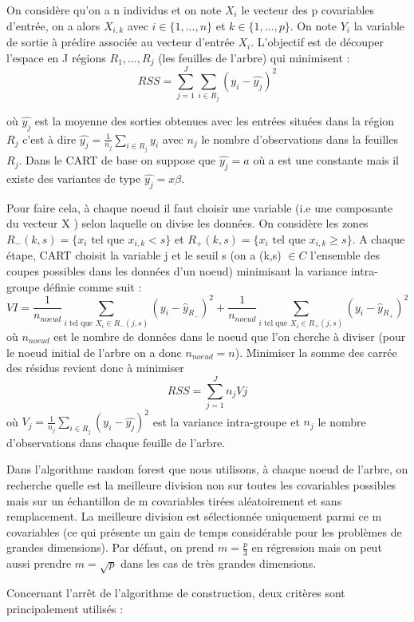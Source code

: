 \documentclass[
]{article}
\begin{document}
On considère qu'on a n individus et on note \(X_i\) le vecteur des p
covariables d'entrée, on a alors \(X_{i,k}\) avec \(i \in \{1,...,n\}\)
et \(k \in \{1,...,p\}\). On note \(Y_i\) la variable de sortie à
prédire associée au vecteur d'entrée \(X_i\). L'objectif est de découper
l'espace en J régions \(R_1,..., R_j\) (les feuilles de l'arbre) qui
minimisent :
\[RSS=\sum_{j=1}^{J}{\sum_{i\in R_j}{}}{(y_{i}-\hat{y_j})^2}\]

où \(\hat{y_j}\) est la moyenne des sorties obtenues avec les entrées
situées dans la région \(R_j\) c'est à dire
\(\hat{y_j}=\frac{1}{n_j}\sum_{i\in R_j}y_i\) avec \(n_j\) le nombre
d'observations dans la feuilles \(R_j\). Dans le CART de base on suppose
que \(\hat{y_j}=a\) où a est une constante mais il existe des variantes
de type \(\hat{y_j}=x \beta\).

Pour faire cela, à chaque noeud il faut choisir une variable (i.e une
composante du vecteur X ) selon laquelle on divise les données. On
considère les zones \(R_{-}(k,s)=\{x_i \text{ tel que }x_{i,k}<s\}\) et
\(R_{+}(k,s)=\{x_i\text{ tel que }x_{i,k}\geq s\}\). A chaque étape,
CART choisit la variable j et le seuil s (on a (k,s) \(\in C\)
l'ensemble des coupes possibles dans les données d'un noeud) minimisant
la variance intra-groupe définie comme suit :
\[VI=\frac{1}{n_{noeud}}\sum_{i \text{ tel que } X_i \in R_{-}(j,s)}(y_i-\hat{y}_{R_{-}})^2+\frac{1}{n_{noeud}}\sum_{i \text{ tel que } X_i\in R_{+}(j,s)}(y_i-\hat{y}_{R_{+}})^2\]
où \(n_{noeud}\) est le nombre de données dans le noeud que l'on cherche
à diviser (pour le noeud initial de l'arbre on a donc \(n_{noeud}=n\)).
Minimiser la somme des carrée des résidus revient donc à minimiser
\[RSS=\sum_{j=1}^{J}n_jVj\] où
\(V_j=\frac{1}{n_j}\sum_{i\in R_j}(y_i-\hat{y_j})^2\) est la variance
intra-groupe et \(n_j\) le nombre d'observations dans chaque feuille de
l'arbre.

Dans l'algorithme random forest que nous utilisons, à chaque noeud de
l'arbre, on recherche quelle est la meilleure division non sur toutes
les covariables possibles mais sur un échantillon de m covariables
tirées aléatoirement et sans remplacement. La meilleure division est
sélectionnée uniquement parmi ce m covariables (ce qui présente un gain
de temps considérable pour les problèmes de grandes dimensions). Par
défaut, on prend \(m=\frac{p}{3}\) en régression mais on peut aussi
prendre \(m=\sqrt{p}\) dans les cas de très grandes dimensions.

Concernant l'arrêt de l'algorithme de construction, deux critères sont
principalement utilisés :
\end{document}
